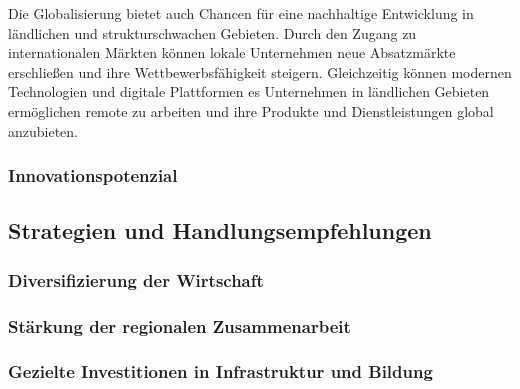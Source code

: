 Die Globalisierung bietet auch Chancen für eine nachhaltige Entwicklung in ländlichen und strukturschwachen Gebieten. Durch den Zugang zu internationalen Märkten können lokale Unternehmen neue Absatzmärkte erschließen und ihre Wettbewerbsfähigkeit steigern. Gleichzeitig können modernen Technologien und digitale Plattformen es Unternehmen in ländlichen Gebieten ermöglichen remote zu arbeiten und ihre Produkte und Dienstleistungen global anzubieten.

\subsubsection{Innovationspotenzial}



\subsection{Strategien und Handlungsempfehlungen}

\subsubsection{Diversifizierung der Wirtschaft}

\subsubsection{Stärkung der regionalen Zusammenarbeit}

\subsubsection{Gezielte Investitionen in Infrastruktur und Bildung}